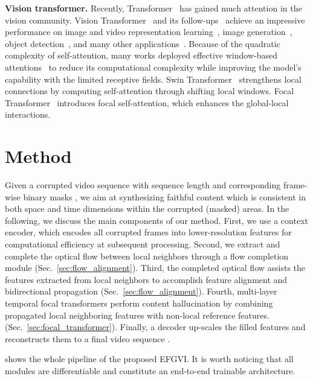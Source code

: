 \documentclass[final]{cvpr}
\newcommand{\subtitle}[1]{\noindent \textbf{#1}}
\newcommand{\methodname}{EFGVI}
\begin{document}
\subtitle{Vision transformer.}
Recently, Transformer~\cite{NIPS2017_3f5ee243} has gained much attention in the vision community.
Vision Transformer~\cite{dosovitskiy2021an} and its follow-ups~\cite{pmlr-v139-touvron21a,yuan2021tokens,liu2021Swin,yang2021focal, guo2022visual}
achieve an impressive performance on image and video representation learning~\cite{chen2020generative,desai2021virtex,liu2021video,patrick2021keeping}, 
image generation~\cite{parmar2018image}, object detection~\cite{carion2020end,zhu2020deformable}, and many other applications~\cite{choromanski2020rethinking,cheng2021maskformer,liang2021swinir,guo2022attention}.
Because of the quadratic complexity of self-attention, many works deployed effective window-based attentions~\cite{liu2021Swin,yang2021focal,dong2021cswin} to reduce its computational complexity while improving the model's capability with the limited receptive fields.
Swin Transformer~\cite{liu2021Swin} strengthens local connections by computing self-attention through shifting local windows.
Focal Transformer~\cite{yang2021focal} introduces focal self-attention, which enhances the global-local interactions. \section{Method}
Given a corrupted video sequence  with sequence length  and corresponding frame-wise binary masks ,
we aim at synthesizing faithful content which is consistent in both space and time dimensions within the corrupted (masked) areas.
In the following, we discuss the main components of our method.
First, we use a context encoder, which encodes all corrupted frames into lower-resolution features for computational efficiency at subsequent processing.
Second, we extract and complete the optical flow between local neighbors through a flow completion module (Sec.~\ref{sec:flow_alignment}).
Third, the completed optical flow assists the features extracted from local neighbors to accomplish feature alignment and bidirectional propagation (Sec.~\ref{sec:flow_alignment}).
Fourth, multi-layer temporal focal transformers perform content hallucination by combining propagated local neighboring features with non-local reference features. (Sec.~\ref{sec:focal_transformer}). 
Finally, a decoder up-scales the filled features and reconstructs them to a final video sequence .

 shows the whole pipeline of the proposed \methodname. 
It is worth noticing that all modules are differentiable and constitute an end-to-end trainable architecture.
\end{document}
